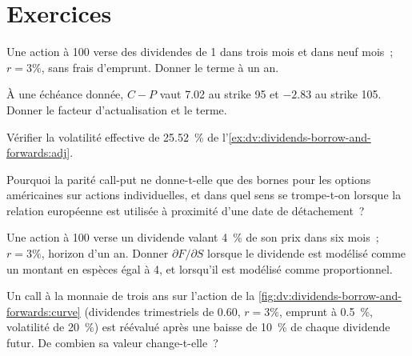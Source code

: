 \section{Exercices}

\begin{exercise}[$\star$]\label{exo:dv:dividends-borrow-and-forwards:1}
Une action à 100 verse des dividendes de 1 dans trois mois et dans neuf mois~; $r=3\%$, sans frais
d'emprunt. Donner le terme à un an.
\end{exercise}

\begin{exercise}[$\star$]\label{exo:dv:dividends-borrow-and-forwards:2}
À une échéance donnée, $C-P$ vaut 7.02 au strike 95 et $-2.83$ au strike 105. Donner le
facteur d'actualisation et le terme.
\end{exercise}

\begin{exercise}[$\star$]\label{exo:dv:dividends-borrow-and-forwards:3}
Vérifier la volatilité effective de 25.52~\% de l'\cref{ex:dv:dividends-borrow-and-forwards:adj}.
\end{exercise}

\begin{exercise}[$\star\star$]\label{exo:dv:dividends-borrow-and-forwards:4}
Pourquoi la parité call-put ne donne-t-elle que des bornes pour les options américaines sur actions individuelles, et dans
quel sens se trompe-t-on lorsque la relation européenne est utilisée à proximité d'une date de détachement~?
\end{exercise}

\begin{exercise}[$\star\star$]\label{exo:dv:dividends-borrow-and-forwards:5}
Une action à 100 verse un dividende valant 4~\% de son prix dans six mois~; $r=3\%$, horizon d'un an.
Donner $\partial F/\partial S$ lorsque le dividende est modélisé comme un montant en espèces égal à 4, et
lorsqu'il est modélisé comme proportionnel.
\end{exercise}

\begin{exercise}[$\star\star$]\label{exo:dv:dividends-borrow-and-forwards:6}
Un call à la monnaie de trois ans sur l'action de la \cref{fig:dv:dividends-borrow-and-forwards:curve}
(dividendes trimestriels de 0.60, $r=3\%$, emprunt à 0.5~\%, volatilité de 20~\%) est réévalué après une
baisse de 10~\% de chaque dividende futur. De combien sa valeur change-t-elle~?
\end{exercise}


